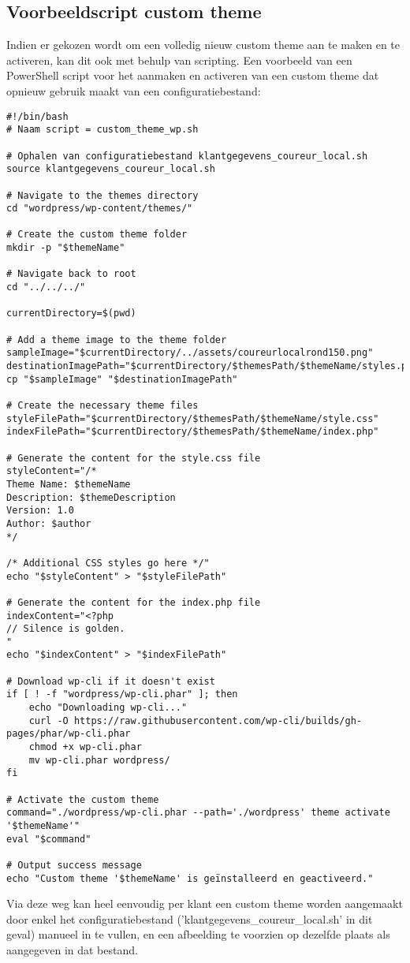 \subsection{Voorbeeldscript custom theme}
Indien er gekozen wordt om een volledig nieuw custom theme aan te maken en te activeren, kan dit ook met behulp van scripting.
Een voorbeeld van een PowerShell script voor het aanmaken en activeren van een custom theme dat opnieuw gebruik maakt van een configuratiebestand:
\begin{verbatim}
#!/bin/bash
# Naam script = custom_theme_wp.sh

# Ophalen van configuratiebestand klantgegevens_coureur_local.sh
source klantgegevens_coureur_local.sh

# Navigate to the themes directory
cd "wordpress/wp-content/themes/"

# Create the custom theme folder
mkdir -p "$themeName"

# Navigate back to root
cd "../../../"

currentDirectory=$(pwd)

# Add a theme image to the theme folder
sampleImage="$currentDirectory/../assets/coureurlocalrond150.png"
destinationImagePath="$currentDirectory/$themesPath/$themeName/styles.png"
cp "$sampleImage" "$destinationImagePath"

# Create the necessary theme files
styleFilePath="$currentDirectory/$themesPath/$themeName/style.css"
indexFilePath="$currentDirectory/$themesPath/$themeName/index.php"

# Generate the content for the style.css file
styleContent="/*
Theme Name: $themeName
Description: $themeDescription
Version: 1.0
Author: $author
*/

/* Additional CSS styles go here */"
echo "$styleContent" > "$styleFilePath"

# Generate the content for the index.php file
indexContent="<?php
// Silence is golden.
"
echo "$indexContent" > "$indexFilePath"

# Download wp-cli if it doesn't exist
if [ ! -f "wordpress/wp-cli.phar" ]; then
    echo "Downloading wp-cli..."
    curl -O https://raw.githubusercontent.com/wp-cli/builds/gh-pages/phar/wp-cli.phar
    chmod +x wp-cli.phar
    mv wp-cli.phar wordpress/
fi

# Activate the custom theme
command="./wordpress/wp-cli.phar --path='./wordpress' theme activate '$themeName'"
eval "$command"

# Output success message
echo "Custom theme '$themeName' is geïnstalleerd en geactiveerd."
\end{verbatim}
Via deze weg kan heel eenvoudig per klant een custom theme worden aangemaakt door enkel het configuratiebestand ('klantgegevens\_coureur\_local.sh' in dit geval) manueel in te vullen, en een afbeelding te voorzien op dezelfde plaats als aangegeven in dat bestand.

